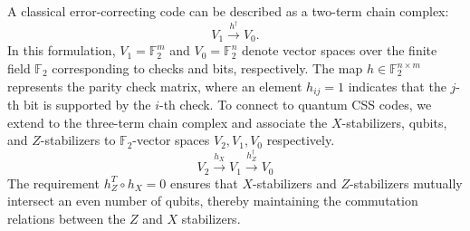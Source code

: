\documentclass[aps,prl,english,superscriptaddress,twocolumn,tightenlines,showpacs,longbibliography,floatfix,amsfonts]{revtex4-2}
\begin{document}
A classical error-correcting code can be described as a two-term chain complex:
\begin{equation}\label{classical_chain}
	V_1 \overset{h^\dagger}{\longrightarrow} V_0.
\end{equation}
In this formulation, $V_1=\mathbb{F}_2^m$ and $V_0=\mathbb{F}_2^n$ denote vector spaces over the finite field $\mathbb{F}_2$ corresponding to checks and bits, respectively. The map $h\in \mathbb{F}_2^{n\times m}$ represents the parity check matrix, where an element $h_{ij}=1$ indicates that the $j$-th bit is supported by the $i$-th check. To connect to quantum CSS codes, we extend to the three-term chain complex and associate the $X$-stabilizers, qubits, and $Z$-stabilizers to $\mathbb{F}_2$-vector spaces $V_2, V_1, V_0$ respectively.
\begin{equation}\label{CSS_chain}
	V_2 \overset{h_X}{\longrightarrow} V_1 \overset{h_Z^\dagger}{\longrightarrow} V_0
\end{equation}  
The requirement $h_Z^T\circ h_X=0$ ensures that $X$-stabilizers and $Z$-stabilizers mutually intersect an even number of qubits, thereby maintaining the commutation relations between the $Z$ and $X$ stabilizers.
\end{document}
